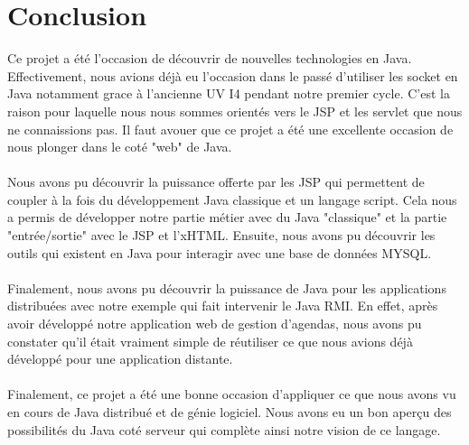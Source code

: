 \documentclass[12pt , a4paper]{article}
\begin{document}
\section{Conclusion}
\noindent Ce projet a été l'occasion de découvrir de nouvelles technologies en Java. Effectivement, nous avions déjà eu l'occasion dans le passé d'utiliser les socket en Java notamment grace à l'ancienne
UV I4 pendant notre premier cycle.  C'est la raison pour laquelle nous nous sommes orientés vers le JSP  et les servlet que nous ne connaissions pas. Il faut avouer  que ce projet a été une excellente
occasion de nous plonger dans le coté "web" de Java. \\ \\
\noindent Nous avons pu découvrir la puissance offerte par les JSP qui permettent de coupler à la fois du développement Java classique et un langage script. Cela nous a permis de développer notre partie métier
avec du Java "classique" et la partie "entrée/sortie" avec le JSP et l'xHTML. Ensuite, nous avons pu découvrir les outils qui existent en Java pour interagir avec une base de données MYSQL.\\ \\
\noindent Finalement, nous avons pu découvrir la puissance de Java pour les applications distribuées avec notre exemple qui fait intervenir le Java RMI. En effet, après avoir développé notre application web de
gestion d'agendas, nous avons pu constater qu'il était vraiment simple de réutiliser ce que nous avions déjà développé pour une application distante.\\ \\
\noindent Finalement, ce projet a été une bonne occasion d'appliquer ce que nous avons vu en cours de Java distribué et de génie logiciel. Nous avons eu un bon aperçu des possibilités du Java coté serveur qui
complète ainsi notre vision de ce langage.
\end{document}

